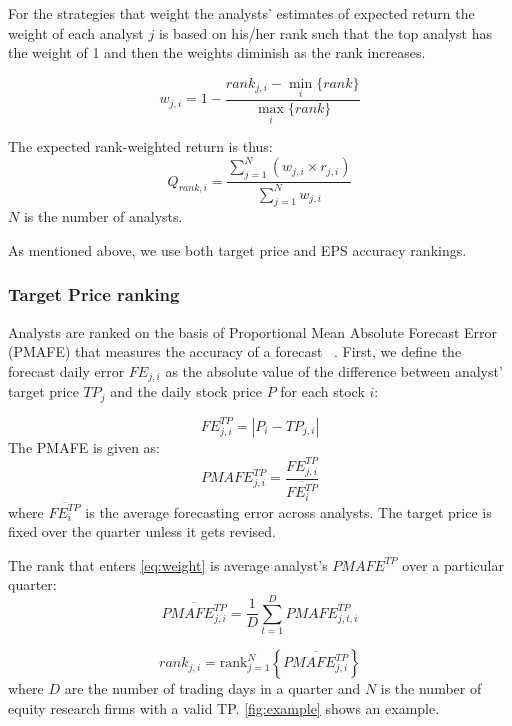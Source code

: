 \documentclass[a4paper,12pt,openright,notitlepage]{report}\usepackage[]{graphicx}\usepackage[]{color}
\begin{document}
For the strategies that weight the analysts' estimates of expected return the weight of each analyst $j$ is based on his/her rank such that the top analyst has the weight of 1 and then the weights diminish as the rank increases.


\begin{equation}
\label{eq:weight}
w_{j,i}=1-\frac{rank_{j,i}-\min_i{ \{rank \} }}{\max_i{\{rank \}}}
\end{equation}

The expected rank-weighted return is thus:
\begin{equation}
\label{rankq}
Q_{rank,i}=\frac{\sum_{j=1}^{N} (w_{j,i} \times r_{j,i})}{\sum_{j=1}^{N} w_{j,i}}
\end{equation}
$N$ is the number of analysts.

As mentioned above, we use both target price and EPS accuracy rankings.

\subsubsection{Target Price ranking}
Analysts are ranked on the basis of Proportional Mean Absolute Forecast Error (PMAFE) that measures the accuracy of a forecast ~\citep{clement1999,brown2001,ertimur2007}. First,  we define the forecast daily error  $FE_{j,i}$ as the absolute value of the difference between analyst' target price $TP_{j}$ and the daily stock price $P$ for each stock $i$:

\begin{equation}
\label{dfe}
FE_{j,i}^{TP}=|{P_{i}-TP_{j,i}}|
\end{equation}
The PMAFE is given as:
\begin{equation}
\label{tp:pmafe}
PMAFE_{j,i}^{TP}=\frac{FE_{j,i}^{TP}}{\overline{FE_{i}^{TP}}}
\end{equation}
where $\overline{{FE}_{i}^{TP}}$ is the average forecasting error across analysts. The target price is fixed over the quarter unless it gets revised.

The rank  that enters \ref{eq:weight} is average analyst's $PMAFE^{TP}$ over a particular quarter:
\begin{equation}
\overline{PMAFE_{j,i}^{TP}}=\frac{1}{D} \sum_{t=1}^{D} PMAFE_{j,t,i}^{TP}
\end{equation}

\begin{equation}
\label{tp:rank}
rank_{j,i}=\mathrm{rank}_{j=1}^{N} \left\{ \overline{PMAFE_{j,i}^{TP}} \right\}
\end{equation}
where $D$ are the number of trading days in a quarter and $N$ is the number of equity research firms with a valid TP. \ref{fig:example} shows an example.
\end{document}
